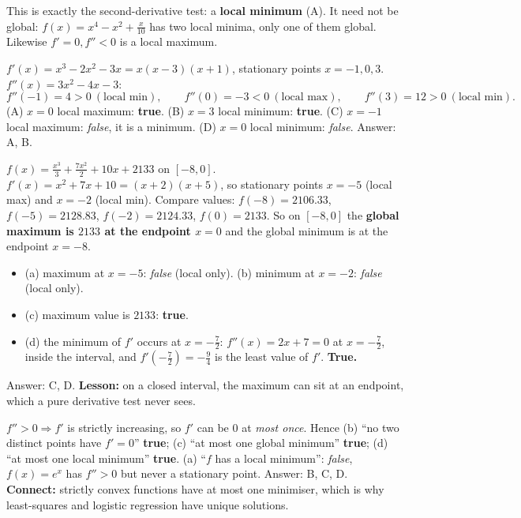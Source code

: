 \documentclass[11pt,a4paper]{article}
\begin{document}
\begin{example}[2024 Q15 (1 mark, MCQ): $f'(x^*)=0$ and $f''(x^*)>0$]
This is exactly the second-derivative test: a \textbf{local minimum} \quad (A). It need not be global: $f(x)=x^4-x^2+\frac x{10}$ has two local minima, only one of them global. Likewise $f'=0,f''<0$ is a local maximum.
\end{example}

\begin{example}[2024 Q50 (2 marks, MSQ): quartic $f=\frac{x^4}4-\frac{2x^3}3-\frac{3x^2}2+1$]
$f'(x)=x^3-2x^2-3x=x(x-3)(x+1)$, stationary points $x=-1,0,3$. $f''(x)=3x^2-4x-3$:
\[f''(-1)=4>0\ (\text{local min}),\qquad f''(0)=-3<0\ (\text{local max}),\qquad f''(3)=12>0\ (\text{local min}).\]
(A) $x=0$ local maximum: \textbf{true}. (B) $x=3$ local minimum: \textbf{true}. (C) $x=-1$ local maximum: \emph{false}, it is a minimum. (D) $x=0$ local minimum: \emph{false}. Answer: A, B.
\end{example}

\begin{example}
$f(x)=\frac{x^3}3+\frac{7x^2}2+10x+2133$ on $[-8,0]$. $f'(x)=x^2+7x+10=(x+2)(x+5)$, so stationary points $x=-5$ (local max) and $x=-2$ (local min). Compare values: $f(-8)=2106.33$, $f(-5)=2128.83$, $f(-2)=2124.33$, $f(0)=2133$. So on $[-8,0]$ the \textbf{global maximum is $2133$ at the endpoint $x=0$} and the global minimum is at the endpoint $x=-8$.
\begin{itemize}[noitemsep]
\item (a) maximum at $x=-5$: \emph{false} (local only). (b) minimum at $x=-2$: \emph{false} (local only).
\item (c) maximum value is $2133$: \textbf{true}.
\item (d) the minimum of $f'$ occurs at $x=-\frac72$: $f''(x)=2x+7=0$ at $x=-\frac72$, inside the interval, and $f'(-\frac72)=-\frac94$ is the least value of $f'$. \textbf{True.}
\end{itemize}
Answer: C, D. \textbf{Lesson:} on a closed interval, the maximum can sit at an endpoint, which a pure derivative test never sees.
\end{example}

\begin{example}
$f''>0\Rightarrow f'$ is strictly increasing, so $f'$ can be $0$ at \emph{most once}. Hence (b) ``no two distinct points have $f'=0$'' \textbf{true}; (c) ``at most one global minimum'' \textbf{true}; (d) ``at most one local minimum'' \textbf{true}. (a) ``$f$ has a local minimum'': \emph{false}, $f(x)=e^x$ has $f''>0$ but never a stationary point. Answer: B, C, D.\\
\textbf{Connect:} strictly convex functions have at most one minimiser, which is why least-squares and logistic regression have unique solutions.
\end{example}
\end{document}

